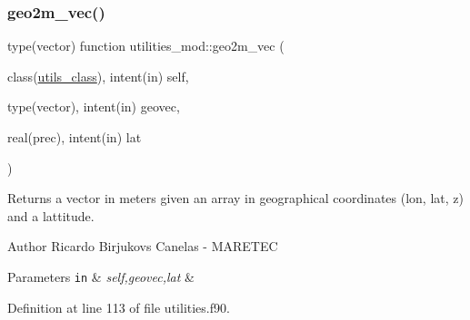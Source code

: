 \subsubsection{\texorpdfstring{geo2m\+\_\+vec()}{geo2m\_vec()}}
{\footnotesize\ttfamily type(vector) function utilities\+\_\+mod\+::geo2m\+\_\+vec (\begin{DoxyParamCaption}\item[{class(\mbox{\hyperlink{structutilities__mod_1_1utils__class}{utils\+\_\+class}}), intent(in)}]{self,  }\item[{type(vector), intent(in)}]{geovec,  }\item[{real(prec), intent(in)}]{lat }\end{DoxyParamCaption})\hspace{0.3cm}{\ttfamily [private]}}



Returns a vector in meters given an array in geographical coordinates (lon, lat, z) and a lattitude. 

\begin{DoxyAuthor}{Author}
Ricardo Birjukovs Canelas -\/ M\+A\+R\+E\+T\+EC 
\end{DoxyAuthor}

\begin{DoxyParams}[1]{Parameters}
\mbox{\tt in}  & {\em self,geovec,lat} & \\
\hline
\end{DoxyParams}


Definition at line 113 of file utilities.\+f90.


